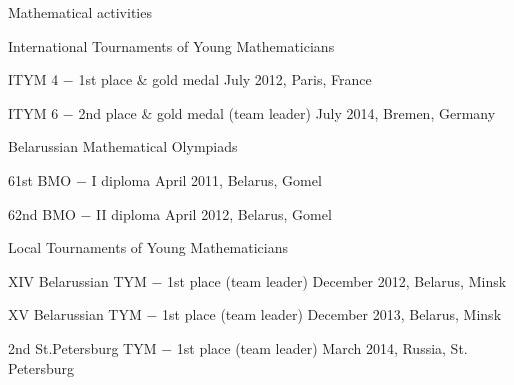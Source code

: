 \documentclass{resume} %
\begin{document}
\begin{rSection}{Mathematical activities}

\begin{rSubsection}{International Tournaments of Young Mathematicians}{}{}

\item ITYM 4 $-$ 1st place \& gold medal \hfill July 2012, Paris, France
\item ITYM 6 $-$ 2nd place \& gold medal (team leader) \hfill July 2014, Bremen, Germany

\end{rSubsection}

\begin{rSubsection}{Belarussian Mathematical Olympiads}{}{}

\item 61st BMO $-$ I diploma \hfill  April 2011, Belarus, Gomel
\item 62nd BMO $-$ II diploma \hfill April 2012, Belarus, Gomel
\end{rSubsection}


\begin{rSubsection}{Local Tournaments of Young Mathematicians}{}{}

\item XIV Belarussian TYM $-$ 1st place (team leader) \hfill December 2012, Belarus, Minsk
\item XV Belarussian TYM $-$ 1st place (team leader) \hfill December 2013, Belarus, Minsk
\item 2nd St.Petersburg TYM $-$ 1st place (team leader) \hfill March 2014, Russia, St. Petersburg
\end{rSubsection}



\end{rSection}





\end{document}
